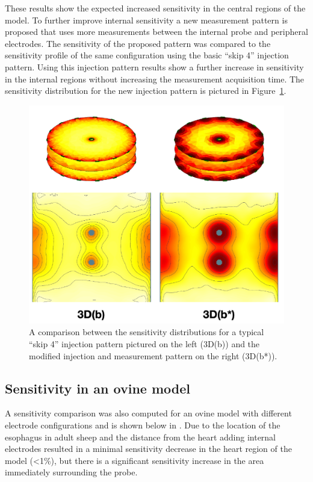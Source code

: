 These results show the expected increased sensitivity in the central regions of the model. 
To further improve internal sensitivity a new
measurement pattern is proposed that uses more measurements between the 
internal probe and peripheral electrodes. 
The sensitivity of the proposed pattern was compared to the sensitivity profile 
of the same configuration using 
the basic ``skip 4'' injection pattern.
Using this injection pattern results show a further increase in sensitivity 
in the internal regions without increasing the measurement
acquisition time. The sensitivity distribution for the new injection pattern 
is pictured in Figure~\ref{fig:modified_measurement_sens}.

\begin{figure}
\centering
\includegraphics[width=\textwidth]{chapter6-internal_electrodes/imgs/Injection_Comparison.pdf}
\caption[Sensitivity using internal electrodes with modified injection patterns]{A comparison between the sensitivity distributions for a typical ``skip 4'' injection pattern pictured on the left (3D(b)) and 
the modified injection and measurement pattern on the right (3D(b*)).}
\label{fig:modified_measurement_sens}
\end{figure}

\subsection{Sensitivity in an ovine model}

A sensitivity comparison was also computed for an ovine model with different 
electrode configurations 
and is shown below in 
. Due to the location of the esophagus in adult sheep
and the distance from the heart
adding internal electrodes resulted 
in a minimal sensitivity decrease in the 
heart region of the model (<1\%), but there is 
a significant sensitivity increase in the area immediately surrounding the 
probe.

